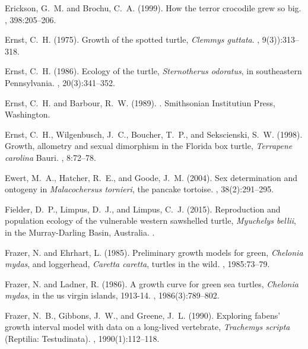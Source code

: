 \documentclass{article}
\begin{document}
\begin{thebibliography}{}
Erickson, G.~M. and Brochu, C.~A. (1999).
\newblock How the terror crocodile grew so big.
, 398:205--206.

Ernst, C.~H. (1975).
\newblock Growth of the spotted turtle, \emph{Clemmys guttata}.
, 9(3)):313--318.

Ernst, C.~H. (1986).
\newblock Ecology of the turtle, \emph{Sternotherus odoratus}, in southeastern
  {P}ennsylvania.
, 20(3):341--352.

Ernst, C.~H. and Barbour, R.~W. (1989).
.
\newblock Smithsonian Institutiun Press, Washington.

Ernst, C.~H., Wilgenbusch, J.~C., Boucher, T.~P., and Sekscienski, S.~W.
  (1998).
\newblock Growth, allometry and sexual dimorphism in the {F}lorida box turtle,
  \emph{Terrapene carolina} {B}auri.
, 8:72--78.

Ewert, M.~A., Hatcher, R.~E., and Goode, J.~M. (2004).
\newblock Sex determination and ontogeny in \emph{Malacochersus tornieri}, the
  pancake tortoise.
, 38(2):291--295.

Fielder, D.~P., Limpus, D.~J., and Limpus, C.~J. (2015).
\newblock Reproduction and population ecology of the vulnerable western
  sawshelled turtle, \emph{Myuchelys bellii}, in the {M}urray-{D}arling
  {B}asin, {A}ustralia.
.

Frazer, N. and Ehrhart, L. (1985).
\newblock Preliminary growth models for green, \emph{Chelonia mydas}, and
  loggerhead, \emph{Caretta caretta}, turtles in the wild.
, 1985:73--79.

Frazer, N. and Ladner, R. (1986).
\newblock A growth curve for green sea turtles, \emph{Chelonia mydas}, in the
  us virgin islands, 1913-14.
, 1986(3):789--802.

Frazer, N.~B., Gibbons, J.~W., and Greene, J.~L. (1990).
\newblock Exploring fabens' growth interval model with data on a long-lived
  vertebrate, \emph{Trachemys scripta} ({R}eptilia: {T}estudinata).
, 1990(1):112--118.


\end{thebibliography}
\end{document}
